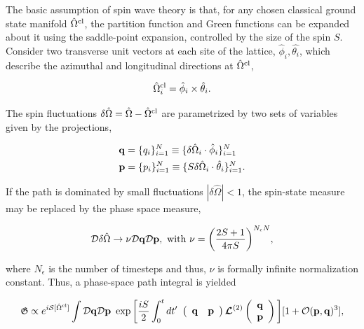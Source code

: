 \documentclass{homework}
\begin{document}
The basic assumption of spin wave theory is that, for any chosen classical ground state manifold $\hat{\Omega}^{\textnormal{cl}}$, the partition function and Green functions can be expanded about it using the saddle-point expansion, controlled by the size of the spin $S$. \\

Consider two transverse unit vectors at each site of the lattice, $\hat{\phi}_i, \hat{\theta_i}$, which describe the azimuthal and longitudinal directions at $\hat{\Omega}^{\textnormal{cl}}$, 

$$
    \hat{\Omega}^{\textnormal{cl}}_i = \hat{\phi}_i \times \hat{\theta}_i. 
$$

The spin fluctuations $\delta\hat{\Omega} = \hat{\Omega} - \hat{\Omega}^{\textnormal{cl}}$ are parametrized by two sets of variables given by the projections, 

\begin{equation} \begin{split}
    &{\bf q} = \{q_i\}_{i=1}^{N} \equiv \{\delta\hat{\Omega}_i \cdot \hat{\phi}_i\}_{i=1}^{N} \\
    &{\bf p} = \{p_i\}_{i=1}^{N} \equiv \{S\delta\hat{\Omega}_i \cdot \hat{\theta}_i\}_{i=1}^{N}. 
\end{split}
\end{equation}

If the path is dominated by small fluctuations $|\delta\hat{\Omega}| < 1$, the spin-state measure may be replaced by the phase space measure,

\begin{equation}
    \mathcal{D} \delta\hat{\Omega} \rightarrow \nu \mathcal{D}{\bf q} \mathcal{D}{\bf p}, \textnormal{ with } \nu = \bigg(\frac{2S+1}{4\pi S}\bigg)^{N_{\epsilon} N},
\end{equation}

where $N_{\epsilon}$ is the number of timesteps and thus, $\nu$ is formally infinite normalization constant. Thus, a phase-space path integral is yielded 

\begin{equation}
    \mathfrak{G} \propto e^{i \mathcal{S}[\hat{\Omega}^{\textnormal{cl}}]} \int \mathcal{D}{\bf q} \mathcal{D}{\bf p} \textnormal{ } \exp \bigg[\frac{iS}{2} \int_{0}^t dt' \textnormal{ } \left( \begin{array}{cc}
          {\bf q} & {\bf p}
    \end{array}\right) \bm{\mathcal{L}}^{(2)} \left( \begin{array}{c}
          {\bf q} \\
          {\bf p}
    \end{array}\right)\bigg] [1+ \mathcal{O}({\bf p}, {\bf q})^3],
    \label{phase_space_spin_wave_path_int}
\end{equation}
\end{document}
